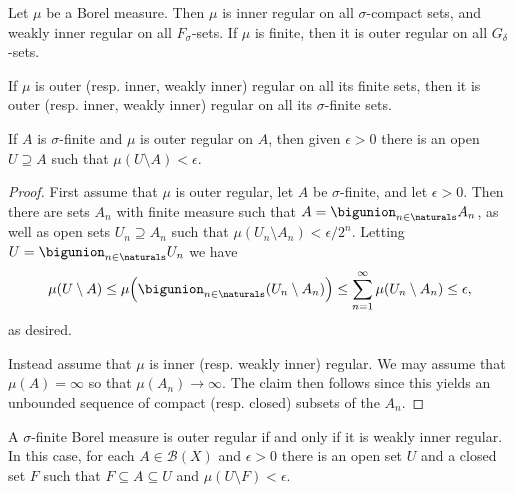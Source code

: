 \documentclass[article, a4paper, 11pt, oneside]{memoir}
\numberwithin{equation}{chapter}
\newcommand{\calB}{\mathcal{B}}
\newcommand{\borel}[1]{\calB(#1)}
\begin{document}
\begin{lemma}
    \label{lem:basic-regularity-that-always-holds}
    Let $\mu$ be a Borel measure. Then $\mu$ is inner regular on all $\sigma$-compact sets, and weakly inner regular on all $F_\sigma$-sets. If $\mu$ is finite, then it is outer regular on all $G_\delta$-sets.
\end{lemma}





\begin{lemma}
    \label{lem:regular-on-finites-implies-sigma-finites}
    If $\mu$ is outer (resp. inner, weakly inner) regular on all its finite sets, then it is outer (resp. inner, weakly inner) regular on all its $\sigma$-finite sets.
    
    If $A$ is $\sigma$-finite and $\mu$ is outer regular on $A$, then given $\epsilon > 0$ there is an open $U \supseteq A$ such that $\mu(U \setminus A) < \epsilon$.
\end{lemma}

\begin{proof}
    First assume that $\mu$ is outer regular, let $A$ be $\sigma$-finite, and let $\epsilon > 0$. Then there are sets $A_n$ with finite measure such that $A = \bigunion_{n \in \naturals} A_n$, as well as open sets $U_n \supseteq A_n$ such that $\mu(U_n \setminus A_n) < \epsilon/2^n$. Letting $U = \bigunion_{n \in \naturals} U_n$ we have
    \begin{equation*}
        \mu(U \setminus A)
            \leq \mu \Bigl( \bigunion_{n \in \naturals} (U_n \setminus A_n) \Bigr)
            \leq \sum_{n=1}^\infty \mu(U_n \setminus A_n)
            \leq \epsilon,
    \end{equation*}
    as desired.

    Instead assume that $\mu$ is inner (resp. weakly inner) regular. We may assume that $\mu(A) = \infty$ so that $\mu(A_n) \to \infty$. The claim then follows since this yields an unbounded sequence of compact (resp. closed) subsets of the $A_n$.
\end{proof}


\begin{lemma}
    \label{lem:outer-regular-iff-weakly-inner-regular}
    A $\sigma$-finite Borel measure is outer regular if and only if it is weakly inner regular. In this case, for each $A \in \borel{X}$ and $\epsilon > 0$ there is an open set $U$ and a closed set $F$ such that $F \subseteq A \subseteq U$ and $\mu(U \setminus F) < \epsilon$.
\end{lemma}
\end{document}
